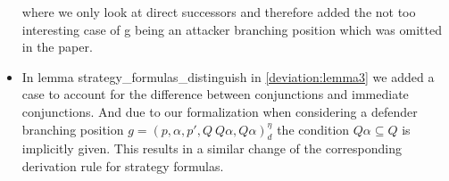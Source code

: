 \begin{itemize}
    where we only look at direct successors and therefore added the not too interesting case of g being an 
    attacker branching position which was omitted in the paper.
    \item In lemma strategy\_formulas\_distinguish in  \ref{deviation:lemma3} we added a case to account for the difference between 
    conjunctions and immediate conjunctions. And due to our formalization when considering a
    defender branching position $g=(p,\alpha ,p', Q \ Q\alpha, Q\alpha)_d^\eta$ the condition 
    $Q \alpha \subseteq Q$ is implicitly given.
    This results in a similar change of the corresponding derivation rule for strategy formulas.
\end{itemize}
